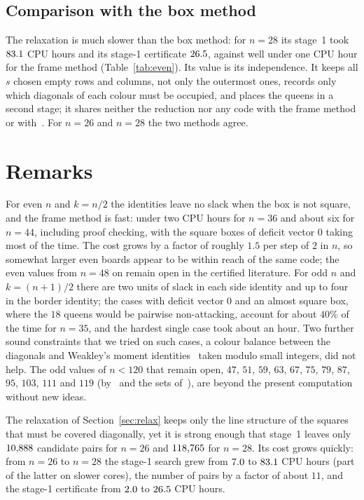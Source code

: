\documentclass[11pt]{article}
\theoremstyle{definition}
\theoremstyle{remark}
\begin{document}
\subsection{Comparison with the box method}\label{sec:box}

The relaxation is much slower than the box method: for $n=28$ its stage~1 took $83.1$ CPU
hours and its stage-1 certificate $26.5$, against well under one CPU hour for the frame method
(Table~\ref{tab:even}). Its value is its independence. It keeps all $s$ chosen empty rows and columns, not
only the outermost ones, records only which diagonals of each colour must be occupied, and places the
queens in a second stage; it shares neither the reduction nor any code with the frame method or
with~\cite{HC}. For $n=26$ and $n=28$ the two methods agree.

\section{Remarks}

For even $n$ and $k=n/2$ the identities leave no slack when the box is not square, and the frame method
is fast: under two CPU hours for $n=36$ and about six for $n=44$, including proof checking, with the
square boxes of deficit vector $0$ taking most of the time. The cost grows by a factor of roughly $1.5$
per step of $2$ in $n$, so somewhat larger even boards appear to be within reach of the same code; the even
values from $n=48$ on remain open in the certified literature. For odd $n$ and $k=(n+1)/2$ there are two
units of slack in each side identity and up to four in the border identity; the cases with deficit vector
$0$ and an almost square box, where the $18$ queens would be pairwise non-attacking, account for about
$40\%$ of the time for $n=35$, and the hardest single case took about an hour. Two further sound
constraints that we tried on such cases, a colour balance between the diagonals and Weakley's moment
identities~\cite{Weakley2022} taken modulo small integers, did not help. The odd values of $n<120$ that
remain open, $47$, $51$, $59$, $63$, $67$, $75$, $79$, $87$, $95$, $103$, $111$ and $119$ (by~\cite{OW}
and the sets of~\cite{Neuhaus}), are beyond the present computation without new ideas.

The relaxation of Section~\ref{sec:relax} keeps only the line structure of the squares that must be
covered diagonally, yet it is strong enough that stage~1 leaves only $10{,}888$ candidate pairs for
$n=26$ and $118{,}765$ for $n=28$. Its cost grows quickly: from $n=26$ to $n=28$ the stage-1
search grew from $7.0$ to $83.1$ CPU hours (part of the latter on slower cores),
the number of pairs by a factor of about $11$, and the stage-1 certificate from $2.0$ to
$26.5$ CPU hours.
\end{document}
